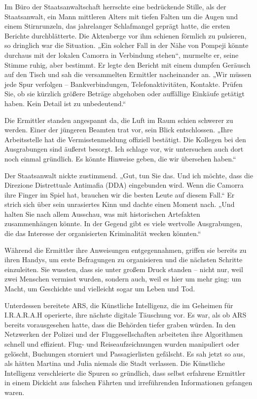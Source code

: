 \documentclass[
]{article}
\begin{document}
Im Büro der Staatsanwaltschaft herrschte eine bedrückende Stille, als
der Staatsanwalt, ein Mann mittleren Alters mit tiefen Falten um die
Augen und einem Stirnrunzeln, das jahrelanger Schlafmangel geprägt
hatte, die ersten Berichte durchblätterte. Die Aktenberge vor ihm
schienen förmlich zu pulsieren, so dringlich war die Situation. „Ein
solcher Fall in der Nähe von Pompeji könnte durchaus mit der lokalen
Camorra in Verbindung stehen``, murmelte er, seine Stimme ruhig, aber
bestimmt. Er legte den Bericht mit einem dumpfen Geräusch auf den Tisch
und sah die versammelten Ermittler nacheinander an. „Wir müssen jede
Spur verfolgen -- Bankverbindungen, Telefonaktivitäten, Kontakte. Prüfen
Sie, ob sie kürzlich größere Beträge abgehoben oder auffällige Einkäufe
getätigt haben. Kein Detail ist zu unbedeutend.``

Die Ermittler standen angespannt da, die Luft im Raum schien schwerer zu
werden. Einer der jüngeren Beamten trat vor, sein Blick entschlossen.
„Ihre Arbeitsstelle hat die Vermisstenmeldung offiziell bestätigt. Die
Kollegen bei den Ausgrabungen sind äußerst besorgt. Ich schlage vor, wir
untersuchen auch dort noch einmal gründlich. Es könnte Hinweise geben,
die wir übersehen haben.``

Der Staatsanwalt nickte zustimmend. „Gut, tun Sie das. Und ich möchte,
dass die Direzione Distrettuale Antimafia (DDA) eingebunden wird. Wenn
die Camorra ihre Finger im Spiel hat, brauchen wir die besten Leute auf
diesem Fall.`` Er strich sich über sein unrasiertes Kinn und dachte
einen Moment nach. „Und halten Sie nach allem Ausschau, was mit
historischen Artefakten zusammenhängen könnte. In der Gegend gibt es
viele wertvolle Ausgrabungen, die das Interesse der organisierten
Kriminalität wecken könnten.``

Während die Ermittler ihre Anweisungen entgegennahmen, griffen sie
bereits zu ihren Handys, um erste Befragungen zu organisieren und die
nächsten Schritte einzuleiten. Sie wussten, dass sie unter großem Druck
standen -- nicht nur, weil zwei Menschen vermisst wurden, sondern auch,
weil es hier um mehr ging: um Macht, um Geschichte und vielleicht sogar
um Leben und Tod.

Unterdessen bereitete ARS, die Künstliche Intelligenz, die im Geheimen
für I.R.A.R.A.H operierte, ihre nächste digitale Täuschung vor. Es war,
als ob ARS bereits vorausgesehen hatte, dass die Behörden tiefer graben
würden. In den Netzwerken der Polizei und der Fluggesellschaften
arbeiteten ihre Algorithmen schnell und effizient. Flug- und
Reiseaufzeichnungen wurden manipuliert oder gelöscht, Buchungen
storniert und Passagierlisten gefälscht. Es sah jetzt so aus, als hätten
Martina und Julia niemals die Stadt verlassen. Die Künstliche
Intelligenz verschleierte die Spuren so gründlich, dass selbst erfahrene
Ermittler in einem Dickicht aus falschen Fährten und irreführenden
Informationen gefangen waren.
\end{document}
